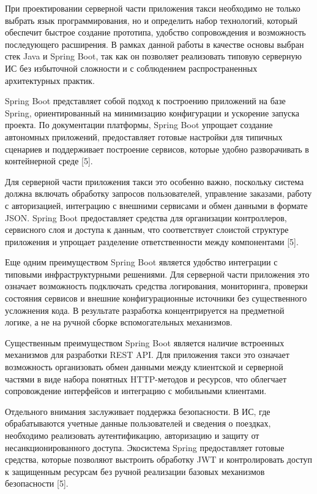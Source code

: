 {\gostFont

  \par \redline При проектировании серверной части приложения такси необходимо не только выбрать язык программирования, но и определить набор технологий, который обеспечит быстрое создание прототипа, удобство сопровождения и возможность последующего расширения. В рамках данной работы в качестве основы выбран стек Java и Spring Boot, так как он позволяет реализовать типовую серверную ИС без избыточной сложности и с соблюдением распространенных архитектурных практик.

  \par \redline Spring Boot представляет собой подход к построению приложений на базе Spring, ориентированный на минимизацию конфигурации и ускорение запуска проекта. По документации платформы, Spring Boot упрощает создание автономных приложений, предоставляет готовые настройки для типичных сценариев и поддерживает построение сервисов, которые удобно разворачивать в контейнерной среде [5].

  \par \redline Для серверной части приложения такси это особенно важно, поскольку система должна включать обработку запросов пользователей, управление заказами, работу с авторизацией, интеграцию с внешними сервисами и обмен данными в формате JSON. Spring Boot предоставляет средства для организации контроллеров, сервисного слоя и доступа к данным, что соответствует слоистой структуре приложения и упрощает разделение ответственности между компонентами [5].

  \par \redline Еще одним преимуществом Spring Boot является удобство интеграции с типовыми инфраструктурными решениями. Для серверной части приложения это означает возможность подключать средства логирования, мониторинга, проверки состояния сервисов и внешние конфигурационные источники без существенного усложнения кода. В результате разработка концентрируется на предметной логике, а не на ручной сборке вспомогательных механизмов.

  \par \redline Существенным преимуществом Spring Boot является наличие встроенных механизмов для разработки REST API. Для приложения такси это означает возможность организовать обмен данными между клиентской и серверной частями в виде набора понятных HTTP-методов и ресурсов, что облегчает сопровождение интерфейсов и интеграцию с мобильными клиентами.

  \par \redline Отдельного внимания заслуживает поддержка безопасности. В ИС, где обрабатываются учетные данные пользователей и сведения о поездках, необходимо реализовать аутентификацию, авторизацию и защиту от несанкционированного доступа. Экосистема Spring предоставляет готовые средства, которые позволяют выстроить обработку JWT и контролировать доступ к защищенным ресурсам без ручной реализации базовых механизмов безопасности [5].

}
